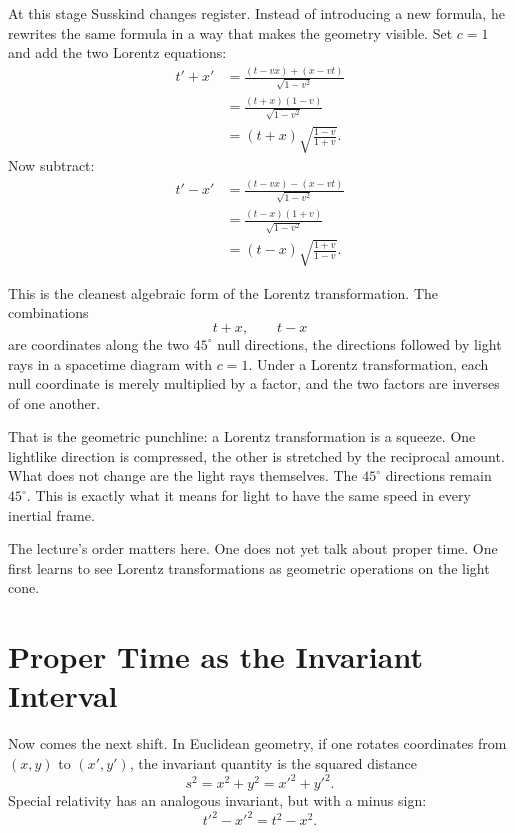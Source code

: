 At this stage Susskind changes register. Instead of introducing a new formula, he rewrites the same formula in a way that makes the geometry visible. Set \(c=1\) and add the two Lorentz equations:
\begin{align}
t'+x'
&= \frac{(t-vx)+(x-vt)}{\sqrt{1-v^2}} \\
&= \frac{(t+x)(1-v)}{\sqrt{1-v^2}} \\
&= (t+x)\sqrt{\frac{1-v}{1+v}}.
\end{align}
Now subtract:
\begin{align}
t'-x'
&= \frac{(t-vx)-(x-vt)}{\sqrt{1-v^2}} \\
&= \frac{(t-x)(1+v)}{\sqrt{1-v^2}} \\
&= (t-x)\sqrt{\frac{1+v}{1-v}}.
\end{align}

This is the cleanest algebraic form of the Lorentz transformation. The combinations
\begin{equation}
t+x, \qquad t-x
\end{equation}
are coordinates along the two \(45^\circ\) null directions, the directions followed by light rays in a spacetime diagram with \(c=1\). Under a Lorentz transformation, each null coordinate is merely multiplied by a factor, and the two factors are inverses of one another.

That is the geometric punchline: a Lorentz transformation is a squeeze. One lightlike direction is compressed, the other is stretched by the reciprocal amount. What does not change are the light rays themselves. The \(45^\circ\) directions remain \(45^\circ\). This is exactly what it means for light to have the same speed in every inertial frame.

The lecture's order matters here. One does not yet talk about proper time. One first learns to see Lorentz transformations as geometric operations on the light cone.

\section{Proper Time as the Invariant Interval}

Now comes the next shift. In Euclidean geometry, if one rotates coordinates from \((x,y)\) to \((x',y')\), the invariant quantity is the squared distance
\begin{equation}
s^2 = x^2+y^2 = x'^2+y'^2.
\end{equation}
Special relativity has an analogous invariant, but with a minus sign:
\begin{equation}
t'^2-x'^2 = t^2-x^2.
\end{equation}

